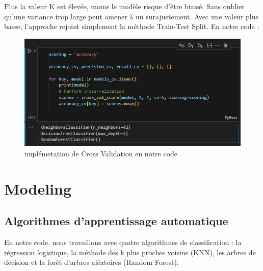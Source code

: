 \documentclass[a4paper,12pt]{report}
\begin{document}
\noindent \normalsize Plus la valeur K est élevée, moins le modèle risque d'être biaisé. Sans oublier qu'une variance trop large peut amener à un surajustement. Avec une valeur plus basse, l'approche rejoint simplement la méthode Train-Test Split.
En notre code :
\begin{figure}[H]
\centering
 \includegraphics[scale=0.9]{outils-images/data10.png}
\caption{implémetation de Cross Validation en notre code}
\end{figure} 

\section{Modeling}
\subsection{Algorithmes d'apprentissage automatique}
\noindent \normalsize En notre code, nous travaillons avec quatre algorithmes de classification : la régression logistique, la méthode des k plus proches voisins (KNN), les arbres de décision et la forêt d'arbres aléatoires (Random Forest).
\end{document}
